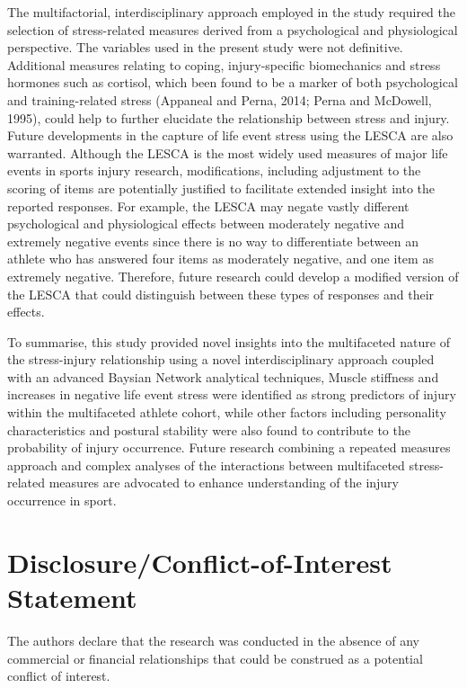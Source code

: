 \documentclass[
  english,
  man,floatsintext]{apa6}
\begin{document}
The multifactorial, interdisciplinary approach employed in the study required the selection of stress-related measures derived from a psychological and physiological perspective. The variables used in the present study were not definitive.
Additional measures relating to coping, injury-specific biomechanics and stress hormones such as cortisol, which been found to be a marker of both psychological and training-related stress (Appaneal and Perna, 2014; Perna and McDowell, 1995), could help to further elucidate the relationship between stress and injury. Future developments in the capture of life event stress using the LESCA are also warranted. Although the LESCA is the most widely used measures of major life events in sports injury research, modifications, including adjustment to the scoring of items are potentially justified to facilitate extended insight into the reported responses. For example, the LESCA may negate vastly different psychological and physiological effects between moderately negative and extremely negative events since there is no way to differentiate between an athlete who has answered four items as moderately negative, and one item as extremely negative. Therefore, future research could develop a modified version of the LESCA that could distinguish between these types of responses and their effects.

To summarise, this study provided novel insights into the multifaceted nature of the stress-injury relationship using a novel interdisciplinary approach coupled with an advanced Baysian Network analytical techniques, Muscle stiffness and increases in negative life event stress were identified as strong predictors of injury within the multifaceted athlete cohort, while other factors including personality characteristics and postural stability were also found to contribute to the probability of injury occurrence. Future research combining a repeated measures approach and complex analyses of the interactions between multifaceted stress-related measures are advocated to enhance understanding of the injury occurrence in sport.

\hypertarget{disclosureconflict-of-interest-statement}{%
\section{Disclosure/Conflict-of-Interest Statement}\label{disclosureconflict-of-interest-statement}}

The authors declare that the research was conducted in the absence of any
commercial or financial relationships that could be construed as a potential
conflict of interest.
\end{document}
